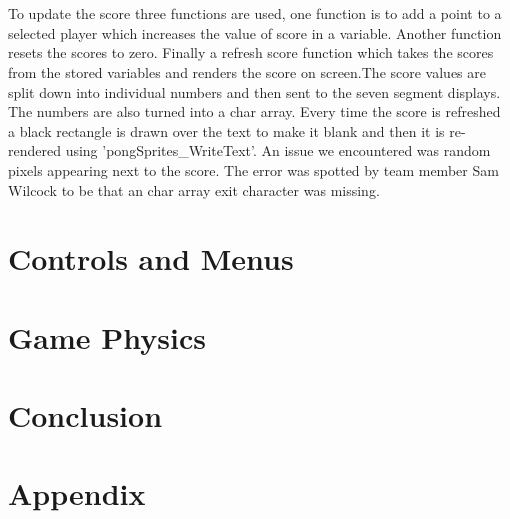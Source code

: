 \documentclass[a4paper,12pt]{article}
\begin{document}
\begin{flushleft}
\\ \- \\
To update the score three functions are used, one function is to add a point to a selected player which increases the value of score in a variable. Another function resets the scores to zero. Finally a refresh score function which takes the scores from the stored variables and renders the score on screen.The score values are split down into individual numbers and then sent to the seven segment displays. The numbers are also turned into a char array. Every time the score is refreshed a black rectangle is drawn over the text to make it blank and then it is re-rendered using 'pongSprites\_WriteText'. An issue we encountered was random pixels appearing next to the score. The error was spotted by team member Sam Wilcock to be that an char array exit character was missing.
\end{flushleft}
\newpage
\section{Controls and Menus}
\newpage
\section{Game Physics}
\newpage
\section{Conclusion}
\begin{flushleft}

\end{flushleft}
\newpage
\section{Appendix}
\newpage
{}
\begin{flushleft}

\end{flushleft}
\end{document}
